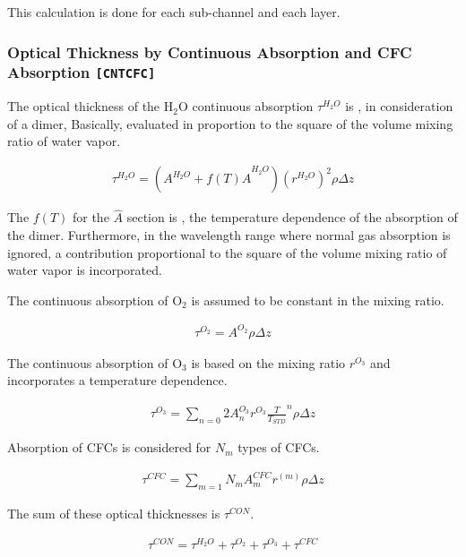 This calculation is done for each sub-channel and each layer.

\hypertarget{optical-thickness-by-continuous-absorption-and-cfc-absorption-modulecntcfc}{%
\subsubsection{\texorpdfstring{Optical Thickness by Continuous
Absorption and CFC Absorption
\texttt{{[}CNTCFC{]}}}{Optical Thickness by Continuous Absorption and CFC Absorption {[}CNTCFC{]}}}\label{optical-thickness-by-continuous-absorption-and-cfc-absorption-modulecntcfc}}

The optical thickness of the H\(_2\)O continuous absorption
\(\tau^{H_2O}\) is , in consideration of a dimer, Basically, evaluated
in proportion to the square of the volume mixing ratio of water vapor.

\begin{eqnarray}
\tau^{H_2O} = ( A^{H_2O} + f(T) \hat{A}^{H_2O} ) (r^{H_2O})^2 \rho \Delta z
\end{eqnarray}

The \(f(T)\) for the \(\hat{A}\) section is , the temperature dependence
of the absorption of the dimer. Furthermore, in the wavelength range
where normal gas absorption is ignored, a contribution
proportional to the square of the volume mixing ratio of water vapor is incorporated.

The continuous absorption of O\(_2\) is assumed to be constant in the
mixing ratio.

\begin{eqnarray}
\tau^{O_2} = A^{O_2} \rho \Delta z
\end{eqnarray}

The continuous absorption of O\(_3\) is based on the mixing ratio
\(r^{O_3}\) and incorporates a temperature dependence.

\begin{eqnarray}
\tau^{O_3} = \sum_{n=0}{2} A^{O_3}_n r^{O_3} \frac{T}{T_{STD}}^n \rho \Delta z
\end{eqnarray}

Absorption of CFCs is considered for \(N_m\) types of CFCs.

\begin{eqnarray}
\tau^{CFC} = \sum_{m=1}{N_m} A^{CFC}_m r^{(m)} \rho \Delta z
\end{eqnarray}

The sum of these optical thicknesses is \(\tau^{CON}\).

\begin{eqnarray}
 \tau^{CON} =  \tau^{H_2O} + \tau^{O_2} + \tau^{O_3} + \tau^{CFC} 
\end{eqnarray}

